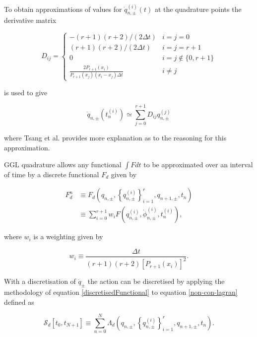 \documentclass[10pt]{iopart}
\begin{document}
To obtain approximations of values for $\dot{q}_{n,\pm}^{(i)}(t)$ at the quadrature points the derivative matrix \cite{Boyd}

\begin{equation}
	D_{ij} = 
	\begin{cases}
		-(r+1)(r+2)/(2\Delta t) &i=j=0 \\
		(r+1)(r+2)/(2\Delta t) &i=j=r+1 \\
		0 &i=j\notin\{0,r+1\} \\
		\frac{2P_{r+1}(x_i)}{P_{r+1}(x_j)(x_i-x_j)\Delta t} &i\neq j
	\end{cases}
\end{equation}
	
is used to give

\begin{equation}
	\dot{q}_{n,\pm}(t_n^{(i)}) \simeq \sum_{j=0}^{r+1} D_{ij}q_{n,\pm}^{(j)}
\end{equation}

where Tsang et al. \cite{Tsang_Slimplectic} provides more explanation as to the reasoning for this approximation.

 GGL quadrature allows any functional $\int F dt$ to be approximated over an interval of time by a discrete functional $F_d$ given by
 
\begin{equation}
\label{discretisedFunctional}
\begin{aligned}
F_d^n &\equiv F_d\left(q_{n, \pm},\left\{q_{n, \pm}^{(i)}\right\}_{i=1}^r, q_{n+1, \pm}, t_n\right) \\  &\equiv \sum_{i=0}^{r+1} w_i F\left(q_{n, \pm}^{(i)}, \dot{\phi}_{n, \pm}^{(i)}, t_n^{(i)}\right),
\end{aligned}
\end{equation}

where $w_i$ is a weighting given by 

\begin{equation}
	w_i \equiv \frac{\Delta t}{(r+1)(r+2)[P_{r+1}(x_i)]^2}.
\end{equation}

With a discretisation of $\dot{q}_{\pm}$ the action can be discretised by applying the methodology of equation \ref{discretisedFunctional} to equation \ref{non-con-lagran} defined as 


\begin{equation}
\mathcal{S}_d\left[t_0, t_{N+1}\right] \equiv \sum_{n=0}^N \Lambda_d\left(q_{n, \pm},\left\{q_{n, \pm}^{(i)}\right\}_{i=1}^r, q_{n+1, \pm}, t_n\right).
\end{equation}
\end{document}
